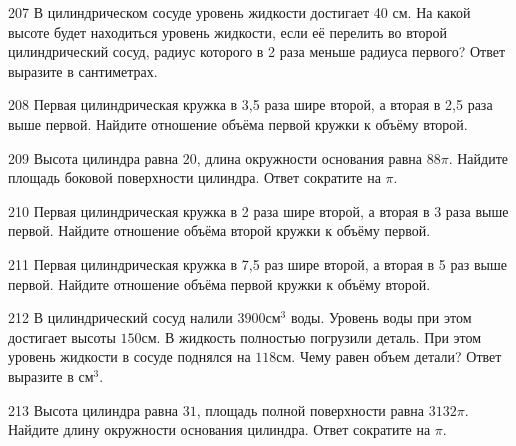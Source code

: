 \documentclass[4apaper]{article}
\begin{document}
\begin{taskBN}{207}
В цилиндрическом сосуде уровень жидкости достигает 40 см. На какой высоте будет находиться уровень жидкости, если её перелить во второй цилиндрический сосуд, радиус которого в 2 раза меньше радиуса первого? Ответ выразите в сантиметрах.
\end{taskBN}

\begin{taskBN}{208}
 Первая цилиндрическая кружка в 3,5 раза шире второй, а вторая в 2,5 раза выше первой. Найдите отношение объёма первой кружки к объёму второй.
\end{taskBN}

\begin{taskBN}{209}
Высота цилиндра равна $20$, длина окружности основания равна $88\pi$. Найдите площадь боковой поверхности цилиндра. Ответ сократите на $\pi$.
\end{taskBN}

\begin{taskBN}{210}
 Первая цилиндрическая кружка в 2 раза шире второй, а вторая в 3 раза выше первой. Найдите отношение объёма второй кружки к объёму первой.
\end{taskBN}

\begin{taskBN}{211}
 Первая цилиндрическая кружка в 7,5 раз шире второй, а вторая в 5 раз выше первой. Найдите отношение объёма первой кружки к объёму второй.
\end{taskBN}

\begin{taskBN}{212}
В цилиндрический сосуд налили $3900\mbox{см}^3$ воды. Уровень воды при этом достигает высоты $150$см. В жидкость полностью погрузили деталь. При этом уровень жидкости в сосуде поднялся на $118$см. Чему равен объем детали? Ответ выразите в $\mbox{см}^3$.
\end{taskBN}

\begin{taskBN}{213}
Высота цилиндра равна $31$, площадь полной поверхности равна $3132\pi$. Найдите длину окружности основания цилиндра. Ответ сократите на $\pi$.
\end{taskBN}
\end{document}
